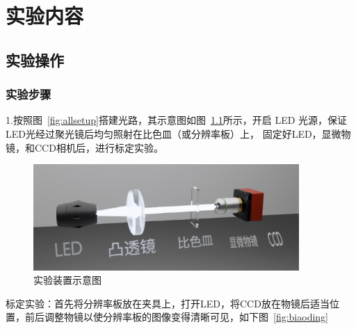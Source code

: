 \documentclass[a4paper]{report} %
\begin{document}
\chapter{实验内容}

\section{实验操作}
\subsection{实验步骤}
1.按照图~\ref{fig:allsetup}搭建光路，其示意图如图~\ref{fig:sets}所示，开启 LED 光源，保证LED光经过聚光镜后均匀照射在比色皿（或分辨率板）上，
固定好LED，显微物镜，和CCD相机后，进行标定实验。
\begin{figure}[H]
    \centering
    \includegraphics[width=0.9\textwidth]{实验示意图.png}
    \caption{实验装置示意图}
    \label{fig:sets}
\end{figure} 
标定实验：首先将分辨率板放在夹具上，打开LED，将CCD放在物镜后适当位置，前后调整物镜以使分辨率板的图像变得清晰可见，如下图~\ref{fig:biaoding}
\end{document}
